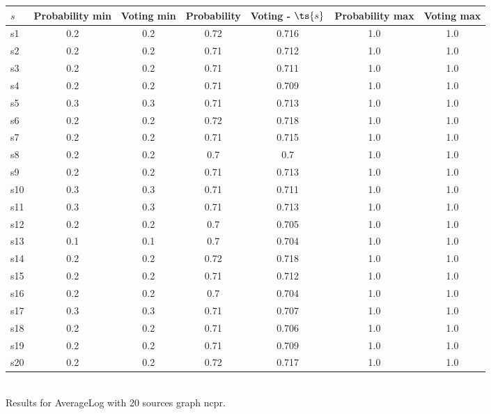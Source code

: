 \documentclass{article}
\begin{document}
\noindent\begin{tabular}{|l|c|c|c|c|c|c|}
\hline
$s$& Probability min & Voting min & Probability & Voting - $\ts{s}$ & Probability max & Voting max\\
\hline
s1 &0.2 & 0.2 & 0.72 & 0.716 & 1.0 & 1.0\\
\hline
s2 &0.2 & 0.2 & 0.71 & 0.712 & 1.0 & 1.0\\
\hline
s3 &0.2 & 0.2 & 0.71 & 0.711 & 1.0 & 1.0\\
\hline
s4 &0.2 & 0.2 & 0.71 & 0.709 & 1.0 & 1.0\\
\hline
s5 &0.3 & 0.3 & 0.71 & 0.713 & 1.0 & 1.0\\
\hline
s6 &0.2 & 0.2 & 0.72 & 0.718 & 1.0 & 1.0\\
\hline
s7 &0.2 & 0.2 & 0.71 & 0.715 & 1.0 & 1.0\\
\hline
s8 &0.2 & 0.2 & 0.7 & 0.7 & 1.0 & 1.0\\
\hline
s9 &0.2 & 0.2 & 0.71 & 0.713 & 1.0 & 1.0\\
\hline
s10 &0.3 & 0.3 & 0.71 & 0.711 & 1.0 & 1.0\\
\hline
s11 &0.3 & 0.3 & 0.71 & 0.713 & 1.0 & 1.0\\
\hline
s12 &0.2 & 0.2 & 0.7 & 0.705 & 1.0 & 1.0\\
\hline
s13 &0.1 & 0.1 & 0.7 & 0.704 & 1.0 & 1.0\\
\hline
s14 &0.2 & 0.2 & 0.72 & 0.718 & 1.0 & 1.0\\
\hline
s15 &0.2 & 0.2 & 0.71 & 0.712 & 1.0 & 1.0\\
\hline
s16 &0.2 & 0.2 & 0.7 & 0.704 & 1.0 & 1.0\\
\hline
s17 &0.3 & 0.3 & 0.71 & 0.707 & 1.0 & 1.0\\
\hline
s18 &0.2 & 0.2 & 0.71 & 0.706 & 1.0 & 1.0\\
\hline
s19 &0.2 & 0.2 & 0.71 & 0.709 & 1.0 & 1.0\\
\hline
s20 &0.2 & 0.2 & 0.72 & 0.717 & 1.0 & 1.0\\
\hline
\end{tabular}\\

\noindent Results for AverageLog with 20 sources graph ncpr.
\end{document}
